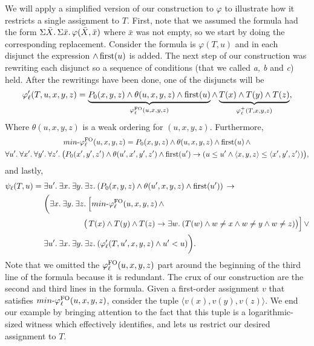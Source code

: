 We will apply a simplified version of our construction to $\varphi$ to illustrate how it restricts a single assignment to $T$. First, note that we assumed the formula had the form $\Sigma{\bar{X}}.\,\Sigma{\bar{x}}.\,\varphi(\bar{X},\bar{x})$ where $\bar{x}$ was not empty, so we start by doing the corresponding replacement. Consider the formula is $\varphi(T,u)$ and in each disjunct the expression $\wedge \operatorname{first}(u)$ is added. The next step of our construction was rewriting each disjunct so a sequence of conditions (that we called {\em a, b} and {\em c}) held. After the rewritings have been done, one of the disjuncts will be
\[
\varphi'_{\ell}(T,u,x,y,z) = \underbrace{P_0(x,y,z)\wedge \theta(u,x,y,z)\wedge \operatorname{first}(u)}_{\varphi^{{\rm FO}}_{\ell}(u,x,y,z)}\wedge \underbrace{T(x)\wedge T(y)\wedge T(z)}_{\varphi^{+}_{\ell}(T,x,y,z)},
\]
Where $\theta(u,x,y,z)$ is a weak ordering for $(u,x,y,z)$. Furthermore,
\begin{multline*}
\text{$min$-}\varphi^{{\rm FO}}_{\ell}(u,x,y,z) = P_0(x,y,z)\wedge \theta(u,x,y,z)\wedge \operatorname{first}(u)\, \wedge \\ \forall{u'}.\:\forall{x'}.\:\forall{y'}.\:\forall{z'}.\:\big(P_0(x',y',z')\wedge \theta(u',x',y',z')\wedge \operatorname{first}(u')\to(u\leq u' \wedge \langle x,y,z\rangle\leq \langle x',y',z'\rangle)\big),
\end{multline*}
and lastly,
\begin{align*}
\psi_{\ell}(T,u) = \; &\exists{u'}.\:\exists{x}.\:\exists{y}.\:\exists{z}.\:(P_0(x,y,z)\wedge \theta(u',x,y,z)\wedge \operatorname{first}(u'))\,\to \\
&\bigg(\exists{x}.\:\exists{y}.\:\exists{z}.\:\Big[\text{$min$-}\varphi^{{\rm FO}}_{\ell}(u,x,y,z)\,\wedge \\ 
&\hspace{5em}\big(\,T(x)\wedge T(y)\wedge T(z)\to\exists{w}.\:(T(w)\wedge w \neq x \wedge w\neq y \wedge w\neq z)\big)\Big]\, \vee\\
&\exists{u'}.\:\exists{x}.\:\exists{y}.\:\exists{z}.\:(\varphi'_{\ell}(T,u',x,y,z)\wedge u' < u)\bigg).
\end{align*}
Note that we omitted the $\varphi^{{\rm FO}}_{\ell}(u,x,y,z)$ part around the beginning of the third line of the formula because it is redundant. The crux of our construction are the second and third lines in the formula. Given a first-order assignment $v$ that satisfies $\text{$min$-}\varphi^{{\rm FO}}_{\ell}(u,x,y,z)$, consider the tuple $\langle v(x),v(y),v(z)\rangle$. We end our example by bringing attention to the fact that this tuple is a logarithmic-sized witness which effectively identifies, and lets us restrict our desired assignment to $T$.
